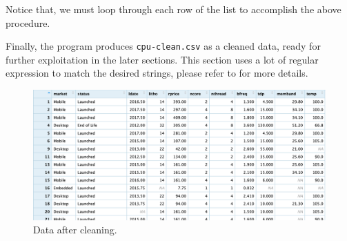 Notice that, we must loop through each row of the list to accomplish the above procedure.

Finally, the program produces \verb|cpu-clean.csv| as a cleaned data, ready for further exploitation in the later sections. This section uses a lot of regular expression
to match the desired strings, please refer to  for more details.

\begin{figure}[H]
    \centering
    \includegraphics[max width=0.9\linewidth]{./graphics/cleaned_data.png}
    \caption{Data after cleaning.}
\end{figure}